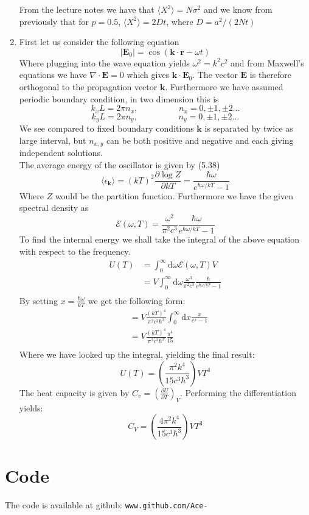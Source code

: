 \documentclass{article}
\begin{document}
\begin{enumerate}[I]
From the lecture notes we have that $\langle X^2 \rangle = N\sigma^2$ and we know from previously that for $p=0.5$, $\langle X^2 \rangle = 2Dt$, where $D=a^2/(2Nt)$
\newpage
\item
First let us consider the following equation 
\[ |\mathbf{E}_0|=\cos(\mathbf{k}\cdot\mathbf{r} - \omega t) \]
Where plugging into the wave equation yields $\omega^2 = k^2 c^2$ and from Maxwell's equations we have $\nabla \cdot \mathbf{E} = 0$ which gives $\mathbf{k} \cdot \mathbf{E}_0$. The vector $\mathbf{E}$ is therefore orthogonal to the propagation vector $\mathbf{k}$. Furthermore we have assumed periodic boundary condition, in two dimension this is\\ 
\[k_xL = 2\pi n_x, \hspace{2cm} n_x = 0, \pm1, \pm2...\]
\[k_yL = 2\pi n_y, \hspace{2cm} n_y = 0, \pm1, \pm2...\]
We see compared to fixed boundary conditions $\mathbf{k}$ is separated by twice as large interval, but $n_{x,y}$ can be both positive and negative and each giving independent solutions.\\

The average energy of the oscillator is given by (5.38)
\[\langle \epsilon_\mathbf{k} \rangle = (kT)^2 \frac{\partial \log Z}{\partial kT}= \frac{\hbar \omega}{e^{\hbar \omega /kT} - 1} \] 
Where $Z$ would be the partition function. Furthermore we have the given spectral density as 
\[ \mathcal{E}(\omega,T) = \frac{\omega^2}{\pi^2 c^3}\frac{\hbar \omega}{e^{\hbar \omega /kT} - 1} \] To find the internal energy we shall take the integral of the above equation with respect to the frequency. 
\begin{align*}
U(T) &= \int_0^\infty \mathrm{d}\omega\mathcal{E}(\omega, T)V \\
&= V \int_0^\infty \mathrm{d}\omega \frac{\omega^3}{\pi^2 c^3}\frac{\hbar}{e^{\hbar \omega /kT} - 1}\\
\end{align*}
By setting $x= \frac{\hbar \omega}{kT}$ we get the following form:
\begin{align*}
&= V \frac{(kT)^4}{\pi^2 c^3 \hbar^3} \int_0^\infty \mathrm{d}x \frac{x}{e^{x} - 1}\\
&= V \frac{(kT)^4}{\pi^2 c^3 \hbar^3} \frac{\pi^4}{15}\\
\end{align*}
Where we have looked up the integral, yielding the final result:
\[ U(T) = \left( \frac{\pi^2 k^4}{15 c^3 \hbar^3}\right) VT^4\]
The heat capacity is given by $C_v = \left(\frac{\partial U}{\partial T}\right )_V$. Performing the differentiation yields:
\[ C_V = \left( \frac{4\pi^2 k^4}{15 c^3 \hbar^3}\right) VT^3\]
\end{enumerate}
\section{Code}
The code is available at github:
\texttt{www.github.com/Ace-}
\end{document}
